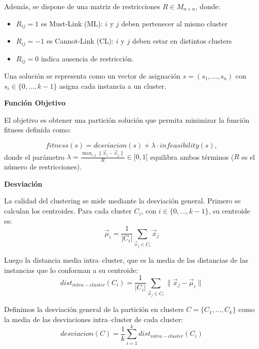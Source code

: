 \documentclass[a4paper,12pt]{article}%
\begin{document}
Además, se dispone de una matriz de restricciones $R\in M_{n \times n}$, donde:
\begin{itemize}
	\item $R_{ij}=1$ es Must-Link (ML): $i$ y $j$ deben pertenecer al mismo cluster
	\item $R_{ij}=-1$ es Cannot-Link (CL): $i$ y $j$ deben estar en distintos clusters
	\item $R_{ij}=0$ indica ausencia de restricción.
\end{itemize}

Una solución se representa como un vector de asignación $s = (s_1, ..., s_n)$ con $s_i \in \{0, ..., k-1\}$ asigna cada instancia a un cluster.


\vspace{0.3cm}
\noindent\textbf{Función Objetivo}

El objetivo es obtener una partición solución que permita minimizar la función fitness definida como:

\begin{equation}\label{fitness_eq}
	fitness(s) = desviacion(s) + \lambda \cdot infeasibility(s),
\end{equation}
donde el parámetro $\lambda= \frac{\max_{i,j} \|\vec{x}_i - \vec{x}_j\|}{R} \in[0,1[$ equilibra ambos términos ($R$ es el número de restricciones).


\vspace{0.3cm}
\noindent\textbf{Desviación}

La calidad del clustering se mide mediante la desviación general. Primero se calculan los centroides. Para cada cluster $C_i$, con $i\in\{0,\dotsc, k-1\}$, su centroide es:
\begin{equation*}
	\vec{\mu}_i = \frac{1}{|C_i|} \sum_{\vec{x}_j \in C_i} \vec{x}_j
\end{equation*}

Luego la distancia media intra--cluster, que es la media de las distancias de las instancias que lo conforman a su centroide:
\begin{equation*}
	dist_{intra-cluster}(C_i) = \frac{1}{|C_i|} \sum_{\vec{x}_j \in C_i} \|\vec{x}_j - \vec{\mu}_i\|
\end{equation*}

Definimos la desviación general de la partición en clusters $C = \{C_1,\dotsc, C_k\}$ como la media de las desviaciones intra--cluster de cada cluster:
\begin{equation*}
	desviacion(C) = \frac{1}{k} \sum_{i=1}^{k} dist_{intra-cluster}(C_i)
\end{equation*}
\end{document}
